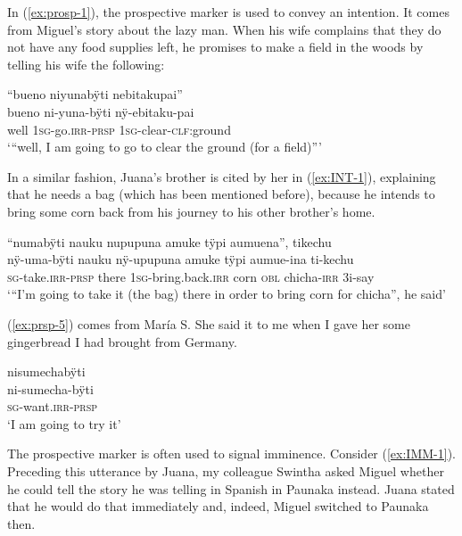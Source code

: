 In (\ref{ex:prosp-1}), the prospective marker is used to convey an intention. It comes from Miguel’s story about the lazy man. When his wife complains that they do not have any food supplies left, he promises to make a field in the woods by telling his wife the following:

\ea\label{ex:prosp-1}
\begingl
\glpreamble “bueno niyunabÿti nebitakupai”\\
\gla bueno ni-yuna-bÿti nÿ-ebitaku-pai\\
\glb well 1\textsc{sg}-go.\textsc{irr}-\textsc{prsp} 1\textsc{sg}-clear-\textsc{clf:}ground\\
\glft ‘“well, I am going to go to clear the ground (for a field)”’
\endgl
\trailingcitation{[mox-n110920l.020]}
\xe

In a similar fashion, Juana’s brother is cited by her in (\ref{ex:INT-1}), explaining that he needs a bag (which has been mentioned before), because he intends to bring some corn back from his journey to his other brother’s home.

\ea\label{ex:INT-1}
\begingl 
\glpreamble “numabÿti nauku nupupuna amuke tÿpi aumuena”, tikechu\\
\gla nÿ-uma-bÿti nauku nÿ-upupuna amuke tÿpi aumue-ina ti-kechu\\ 
\textsc{sg}-take.\textsc{irr}-\textsc{prsp} there 1\textsc{sg}-bring.back.\textsc{irr} corn \textsc{obl} chicha-\textsc{irr} 3i-say\\ 
\glft ‘“I’m going to take it (the bag) there in order to bring corn for chicha”, he said’\\ 
\endgl
\trailingcitation{[jxx-p120430l-2.396]}
\xe

(\ref{ex:prsp-5}) comes from María S. She said it to me when I gave her some gingerbread I had brought from Germany.

\ea\label{ex:prsp-5}
\begingl
\glpreamble nisumechabÿti\\
\gla ni-sumecha-bÿti\\
\textsc{sg}-want.\textsc{irr}-\textsc{prsp}\\
\glft ‘I am going to try it’
\endgl
{}
\xe

The prospective marker is often used to signal imminence. Consider (\ref{ex:IMM-1}). Preceding this utterance by Juana, my colleague Swintha asked Miguel whether he could tell the story he was telling in Spanish in Paunaka instead. Juana stated that he would do that immediately and, indeed, Miguel switched to Paunaka then.

